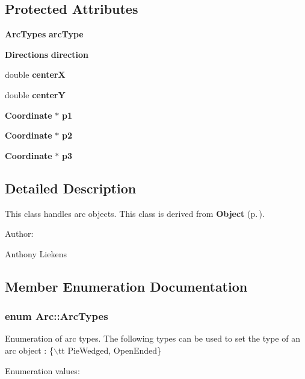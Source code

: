 \subsection*{Protected Attributes}
\begin{CompactItemize}
\item 
{\bf Arc\-Types} {\bf arc\-Type}
\item 
{\bf Directions} {\bf direction}
\item 
double {\bf center\-X}
\item 
double {\bf center\-Y}
\item 
{\bf Coordinate} $\ast$ {\bf p1}
\item 
{\bf Coordinate} $\ast$ {\bf p2}
\item 
{\bf Coordinate} $\ast$ {\bf p3}
\end{CompactItemize}


\subsection{Detailed Description}
This class handles arc objects. This class is derived from {\bf Object} {\rm (p.\,\pageref{classObject})}. \begin{Desc}
\item[Author: ]\par
Anthony Liekens \end{Desc}




\subsection{Member Enumeration Documentation}
\subsubsection{\setlength{\rightskip}{0pt plus 5cm}enum Arc::Arc\-Types}\label{classArc_s5}


Enumeration of arc types. The following types can be used to set the type of an arc object : \{$\backslash$tt Pie\-Wedged, Open\-Ended\} \begin{Desc}
\item[Enumeration values: ]\par
\begin{description}
\item[{\em 
{\em Pie\-Wedged}\label{classArc_s5s2}
}]\item[{\em 
{\em Open\-Ended}\label{classArc_s5s3}
}]\end{description}
\end{Desc}

